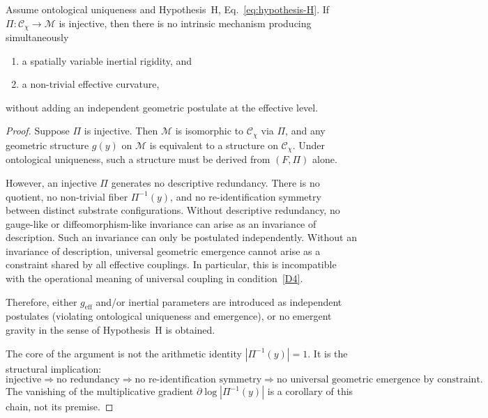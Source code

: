     \begin{lemma}
      \label{lem:injectivity-no-gravity}
      Assume ontological uniqueness and Hypothesis~H, Eq.~\ref{eq:hypothesis-H}.
      If $\Pi : \mathcal{C}_\chi \to \mathcal{M}$ is injective,
      then there is no intrinsic mechanism producing simultaneously
      \begin{enumerate}[label=(\roman*)]
  \item a spatially variable inertial rigidity, and
  \item a non-trivial effective curvature,
      \end{enumerate}
      without adding an independent geometric postulate at the effective level.
    \end{lemma}

    \begin{proof}
      Suppose $\Pi$ is injective.
      Then $\mathcal{M}$ is isomorphic to $\mathcal{C}_\chi$ via $\Pi$,
      and any geometric structure $g(y)$ on $\mathcal{M}$ is equivalent to a structure on $\mathcal{C}_\chi$.
      Under ontological uniqueness, such a structure must be derived from $(F, \Pi)$ alone.

      However, an injective $\Pi$ generates no descriptive redundancy.
      There is no quotient, no non-trivial fiber $\Pi^{-1}(y)$, and no re-identification symmetry between
      distinct substrate configurations.
      Without descriptive redundancy, no gauge-like or diffeomorphism-like invariance can arise as an invariance of
      description.
      Such an invariance can only be postulated independently.
      Without an invariance of description, universal geometric emergence cannot arise as a constraint shared by all
      effective
      couplings.
      In particular, this is incompatible with the operational meaning of universal coupling in condition~\ref{D4}.

      Therefore, either $g_{\mathrm{eff}}$ and/or inertial parameters are introduced as independent postulates
      (violating ontological uniqueness and emergence),
      or no emergent gravity in the sense of Hypothesis~H is obtained.

      The core of the argument is not the arithmetic identity $|\Pi^{-1}(y)| = 1$.
      It is the structural implication:
      \[
        \text{injective}
        \Rightarrow
        \text{no redundancy}
        \Rightarrow
        \text{no re-identification symmetry}
        \Rightarrow
        \text{no universal geometric emergence by constraint.}
      \]
      The vanishing of the multiplicative gradient $\partial \log |\Pi^{-1}(y)|$ is a corollary of this chain,
      not its premise.
    \end{proof}

